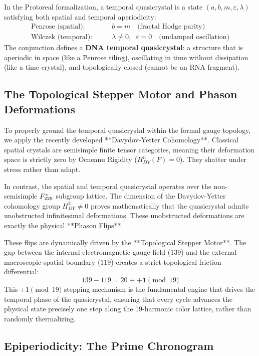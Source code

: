 In the Protoreal formalization, a temporal quasicrystal is a state $(a,b,m,\varepsilon,\lambda)$ satisfying both spatial and temporal aperiodicity:
\begin{align}
\text{Penrose (spatial):} &\qquad b = m \quad \text{(fractal Hodge parity)} \\
\text{Wilczek (temporal):} &\qquad \lambda \neq 0,\;\; \varepsilon = 0 \quad \text{(undamped oscillation)}
\end{align}
The conjunction defines a \textbf{DNA temporal quasicrystal}: a structure that is aperiodic in space (like a Penrose tiling), oscillating in time without dissipation (like a time crystal), and topologically closed (cannot be an RNA fragment).

\subsection{The Topological Stepper Motor and Phason Deformations}

To properly ground the temporal quasicrystal within the formal gauge topology, we apply the recently developed **Davydov-Yetter Cohomology**. Classical spatial crystals are semisimple finite tensor categories, meaning their deformation space is strictly zero by Ocneanu Rigidity ($H^n_{DY}(F) = 0$). They shatter under stress rather than adapt.

In contrast, the spatial and temporal quasicrystal operates over the non-semisimple $F_{229}^*$ subgroup lattice. The dimension of the Davydov-Yetter cohomology group $H^2_{DY} \neq 0$ proves mathematically that the quasicrystal admits unobstructed infinitesimal deformations. These unobstructed deformations are exactly the physical **Phason Flips**.

These flips are dynamically driven by the **Topological Stepper Motor**. The gap between the internal electromagnetic gauge field ($139$) and the external macroscopic spatial boundary ($119$) creates a strict topological friction differential:
\begin{equation}
139 - 119 = 20 \equiv \mathbf{+1} \pmod{19}
\end{equation}
This $+1 \pmod{19}$ stepping mechanism is the fundamental engine that drives the temporal phase of the quasicrystal, ensuring that every cycle advances the physical state precisely one step along the 19-harmonic color lattice, rather than randomly thermalizing.

\subsection{Epiperiodicity: The Prime Chronogram}

